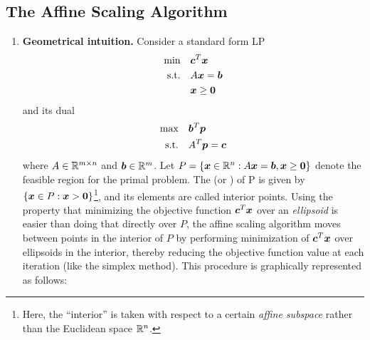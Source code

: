 \subsection{The Affine Scaling Algorithm}
\begin{enumerate}
\item \textbf{Geometrical intuition.} Consider a standard form LP
\begin{align*}
\text{min}\quad&\bm{c}^{T}\bm{x} \\
\text{s.t.}\quad&A\bm{x}=\bm{b} \\
&\bm{x}\ge \bm{0}
\end{align*}
and its dual
\begin{align*}
\text{max}\quad&\bm{b}^{T}\bm{p} \\
\text{s.t.}\quad&A^{T}\bm{p}=\bm{c} \\
\end{align*}
where \(A\in\mathbb{R}^{m\times n}\) and \(\bm{b}\in\mathbb{R}^{m}\). Let
\(P=\{\bm{x}\in\mathbb{R}^n:A\bm{x}=\bm{b},\bm{x}\ge\bm{0}\}\) denote the
feasible region for the primal problem. The  (or ) of P is given by \(\{\bm{x}\in
P:\bm{x}>\bm{0}\}\)\footnote{Here, the ``interior'' is taken with respect
to a certain \emph{affine subspace} rather than the Euclidean space
\(\mathbb{R}^{n}\).}, and its elements are called interior points. Using the property
that minimizing the objective function \(\bm{c}^{T}\bm{x}\) over an
\emph{ellipsoid} is easier than doing that directly over \(P\), the affine scaling
algorithm moves between points in the interior of \(P\) by performing
minimization of \(\bm{c}^{T}\bm{x}\) over ellipsoids in the interior,
thereby reducing the objective function value at each iteration (like the
simplex method). This procedure is graphically represented as follows:
\begin{center}
\end{center}
\end{enumerate}
